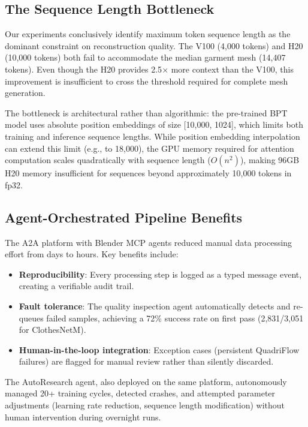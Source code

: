 \documentclass[conference]{IEEEtran}
\begin{document}
\subsection{The Sequence Length Bottleneck}

Our experiments conclusively identify maximum token sequence length as the dominant constraint on reconstruction quality.
The V100 (4,000 tokens) and H20 (10,000 tokens) both fail to accommodate the median garment mesh (14,407 tokens).
Even though the H20 provides 2.5$\times$ more context than the V100, this improvement is insufficient to cross the threshold required for complete mesh generation.

The bottleneck is architectural rather than algorithmic: the pre-trained BPT model uses absolute position embeddings of size [10,000, 1024], which limits both training and inference sequence lengths.
While position embedding interpolation can extend this limit (e.g., to 18,000), the GPU memory required for attention computation scales quadratically with sequence length ($O(n^2)$), making 96GB H20 memory insufficient for sequences beyond approximately 10,000 tokens in fp32.

\subsection{Agent-Orchestrated Pipeline Benefits}

The A2A platform with Blender MCP agents reduced manual data processing effort from days to hours.
Key benefits include:
\begin{itemize}
\item \textbf{Reproducibility}: Every processing step is logged as a typed message event, creating a verifiable audit trail.
\item \textbf{Fault tolerance}: The quality inspection agent automatically detects and re-queues failed samples, achieving a 72\% success rate on first pass (2,831/3,051 for ClothesNetM).
\item \textbf{Human-in-the-loop integration}: Exception cases (persistent QuadriFlow failures) are flagged for manual review rather than silently discarded.
\end{itemize}

The AutoResearch agent, also deployed on the same platform, autonomously managed 20+ training cycles, detected crashes, and attempted parameter adjustments (learning rate reduction, sequence length modification) without human intervention during overnight runs.
\end{document}
